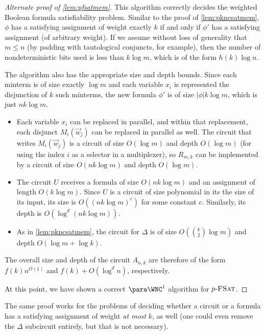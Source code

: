 \begin{proof}[Alternate proof of \autoref{lem:pfsatmem}]
  This algorithm correctly decides the weighted Boolean formula satisfiability problem.
  Similar to the proof of \autoref{lem:pkncsatmem}, $\phi$ has a satisfying assignment of weight exactly $k$ if and only if $\phi'$ has a satisfying assignment (of arbitrary weight).
  If we assume without loss of generality that $m \leq n$ (by padding with tautological conjuncts, for example), then the number of nondeterministic bits used is less than $k \log m$, which is of the form $h(k) \log n$.

  The algorithm also has the appropriate size and depth bounds.
  Since each minterm is of size exactly $\log m$ and each variable $x_i$ is represented the disjunction of $k$ such minterms, the new formula $\phi'$ is of size $|\phi| k \log m$, which is just $n k \log m$.
  \begin{itemize}
  \item
    Each variable $x_i$ can be replaced in parallel, and within that replacement, each disjunct $M_i(\vec{w}_j)$ can be replaced in parallel as well.
    The circuit that writes $M_i(\vec{w}_j)$ is a circuit of size $O(\log m)$ and depth $O(\log m)$ (for using the index $i$ as a selector in a multiplexer), so $R_{m, k}$ can be implemented by a circuit of size $O(n k \log m)$ and depth $O(\log m)$.
  \item
    The circuit $U$ receives a formula of size $O(n k \log m)$ and an assignment of length $O(k \log m)$.
    Since $U$ is a circuit of size polynomial in its the size of its input, its size is $O((n k \log m)^c)$ for some constant $c$.
    Similarly, its depth is $O(\log^d (n k \log m))$.
  \item As in \autoref{lem:pkncsatmem}, the circuit for $\Delta$ is of size $O(\binom{k}{2} \log m)$ and depth $O(\log m + \log k)$.
  \end{itemize}
  The overall size and depth of the circuit $A_{n, k}$ are therefore of the form $f(k) n^{O(1)}$ and $f(k) + O(\log^d n)$, respectively.

  At this point, we have shown a correct $\para \WNC^1$ algorithm for $p \textnormal{-} \textsc{FSat}$.
\end{proof}

The same proof works for the problems of deciding whether a circuit or a formula has a satisfying assignment of weight \emph{at most} $k$, as well (one could even remove the $\Delta$ subcircuit entirely, but that is not necessary).

